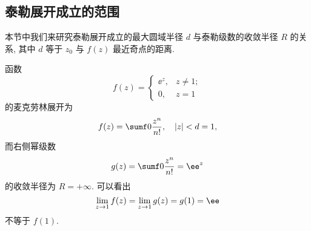 \subsection{泰勒展开成立的范围\optional}
\label{ssec:taylor-expansion-radius}

本节中我们来研究泰勒展开成立的最大圆域半径 $d$ 与泰勒级数的收敛半径 $R$ 的关系, 其中 $d$ 等于 $z_0$ 与 $f(z)$ 最近奇点的距离.

\begin{example}
  函数
  \[
    f(z)=\begin{cases}
      \ee^z,&z\neq 1;\\
      0,&z=1
    \end{cases}
  \]
  的麦克劳林展开为
  \[
    f(z)=\sumf0 \dfrac{z^n}{n!},\quad |z|<d=1,
  \]
  而右侧幂级数
  \[
    g(z)=\sumf0 \dfrac{z^n}{n!}=\ee^z
  \]
  的收敛半径为 $R=+\infty$.
  可以看出
  \[
    \lim_{z\ra 1} f(z)=\lim_{z\ra 1}g(z)=g(1)=\ee
  \]
  不等于 $f(1)$.
\end{example}

